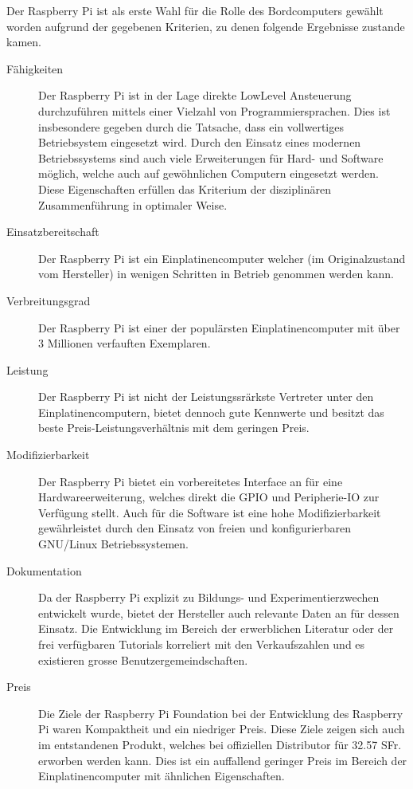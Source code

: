 Der Raspberry Pi ist als erste Wahl für die Rolle des Bordcomputers 
gewählt worden aufgrund der gegebenen Kriterien, zu denen folgende 
Ergebnisse zustande kamen.

\begin{description}
	\item[Fähigkeiten] Der Raspberry Pi ist in der Lage direkte
		LowLevel Ansteuerung durchzuführen mittels einer Vielzahl
		von Programmiersprachen. Dies ist insbesondere gegeben
		durch die Tatsache, dass ein vollwertiges Betriebsystem
		eingesetzt wird. Durch den Einsatz eines modernen
		Betriebssystems sind auch viele Erweiterungen für Hard- 
		und Software möglich, welche auch auf gewöhnlichen 
		Computern eingesetzt werden. Diese Eigenschaften erfüllen
		das Kriterium der disziplinären Zusammenführung in 
		optimaler Weise.
	\item[Einsatzbereitschaft] Der Raspberry Pi ist ein 
		Einplatinencomputer welcher (im Originalzustand vom 
		Hersteller) in wenigen Schritten in Betrieb genommen
		werden kann. 
	\item[Verbreitungsgrad] Der Raspberry Pi ist einer der
		populärsten Einplatinencomputer mit über 3 Millionen
		verfauften Exemplaren.
	\item[Leistung] Der Raspberry Pi ist nicht der Leistungssrärkste
		Vertreter unter den Einplatinencomputern, bietet dennoch
		gute Kennwerte und besitzt das beste
		Preis-Leistungsverhältnis mit dem geringen Preis.
	\item[Modifizierbarkeit] Der Raspberry Pi bietet ein vorbereitetes
		Interface an für eine Hardwareerweiterung, welches direkt
		die GPIO und Peripherie-IO zur Verfügung stellt. Auch
		für die Software ist eine hohe Modifizierbarkeit 
		gewährleistet durch den Einsatz von freien und 
		konfigurierbaren GNU/Linux Betriebssystemen.
	\item[Dokumentation] Da der Raspberry Pi explizit zu 
		Bildungs- und Experimentierzwechen entwickelt wurde, 
		bietet der Hersteller auch relevante Daten an für dessen
		Einsatz. Die Entwicklung im Bereich der
		erwerblichen Literatur oder der frei verfügbaren
		Tutorials korreliert mit den Verkaufszahlen und es 
		existieren grosse Benutzergemeindschaften.
	\item[Preis] Die Ziele der Raspberry Pi Foundation bei der
		Entwicklung des Raspberry Pi waren Kompaktheit und ein 
		niedriger Preis. Diese Ziele zeigen sich auch im
		entstandenen Produkt, welches bei offiziellen Distributor
		für 32.57 SFr. erworben werden kann. Dies ist ein 
		auffallend geringer Preis im Bereich der 
		Einplatinencomputer mit ähnlichen Eigenschaften.
\end{description}

